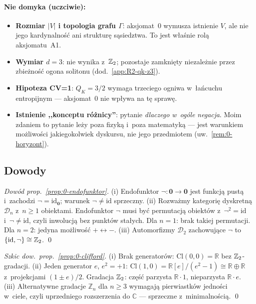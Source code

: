 \paragraph{Nie domyka (uczciwie):}
\begin{itemize}[nosep]
  \item \textbf{Rozmiar $|V|$ i topologia grafu $\Gamma$}: aksjomat~0
    wymusza istnienie $V$, ale nie jego kardynalno\'s\'c ani struktur\k{e}
    s\k{a}siedztwa. To jest w\l{}a\'snie rol\k{a} aksjomatu~A1.
  \item \textbf{Wymiar $d=3$}: nie wynika z~$\mathbb{Z}_2$; pozostaje zamkni\k{e}ty
    niezale\.znie przez zbie\.zno\'s\'c ogona solitonu (dod.~\ref{app:R2-qk-z3}).
  \item \textbf{Hipoteza CV=1}: $Q_K = 3/2$ wymaga trzeciego ogniwa
    w~\l{}a\'ncuchu entropijnym --- aksjomat~0 nie wp\l{}ywa na t\k{e}
    spraw\k{e}.
  \item \textbf{Istnienie ,,konceptu r\'o\.znicy''}: pytanie
    \emph{dlaczego w~og\'ole negacja}. Moim zdaniem to pytanie le\.zy
    poza fizyk\k{a} i~poza matematyk\k{a} --- jest warunkiem
    mo\.zliwości jakiegokolwiek dyskursu, nie jego przedmiotem
    (uw.~\ref{rem:0-horyzont}).
\end{itemize}

\subsection{Dowody}%
\label{app:0-dowody}

\begin{proof}[Dow\'od prop.~\ref{prop:0-endofunktor}]
(i) Endofunktor $\neg: \mathbf{0} \to \mathbf{0}$ jest funkcj\k{a}
pust\k{a} i~zachodzi $\neg = \mathrm{id}_{\mathbf{0}}$; warunek
$\neg \neq \mathrm{id}$ sprzeczny. (ii) Rozwa\.zmy kategori\k{e}
dyskretn\k{a} $\mathcal{D}_n$ z~$n \geq 1$ obiektami. Endofunktor
$\neg$ musi by\'c permutacj\k{a} obiekt\'ow z~$\neg^2 = \mathrm{id}$
i~$\neg \neq \mathrm{id}$, czyli inwolucj\k{a} bez punkt\'ow
sta\l{}ych. Dla $n=1$: brak takiej permutacji. Dla $n=2$: jedyna
mo\.zliwo\'s\'c $+ \leftrightarrow -$. (iii) Automorfizmy
$\mathcal{D}_2$ zachowuj\k{a}ce $\neg$ to $\{\mathrm{id}, \neg\}
\cong \mathbb{Z}_2$. \qed
\end{proof}

\begin{proof}[Szkic dow.~prop.~\ref{prop:0-clifford}]
(i) Brak generator\'ow: $\mathrm{Cl}(0,0) = \mathbb{R}$ bez $\mathbb{Z}_2$-gradacji.
(ii) Jeden generator $e$, $e^2 = +1$: $\mathrm{Cl}(1,0) = \mathbb{R}[e]/(e^2-1)
\cong \mathbb{R} \oplus \mathbb{R}$ z~projekcjami $(1 \pm e)/2$.
Gradacja $\mathbb{Z}_2$: cz\k{e}\'s\'c parzysta $\mathbb{R}\cdot 1$, nieparzysta
$\mathbb{R}\cdot e$. (iii) Alternatywne gradacje $\mathbb{Z}_n$ dla
$n \geq 3$ wymagaj\k{a} pierwiastk\'ow jedno\'sci w~ciele, czyli
uprzedniego rozszerzenia do $\mathbb{C}$ --- sprzeczne z~minimalno\'sci\k{a}.
\qed
\end{proof}

